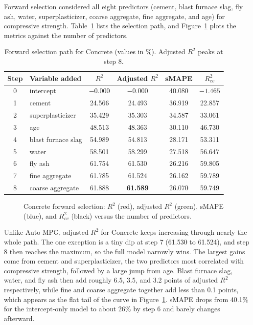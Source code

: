 Forward selection considered all eight predictors (cement, blast furnace slag, fly ash, water, superplasticizer, coarse aggregate, fine aggregate, and age) for compressive strength. Table~\ref{tab:fs-concrete-path} lists the selection path, and Figure~\ref{fig:fs-concrete-path} plots the metrics against the number of predictors.

\begin{table}[H]
    \centering
    \caption{Forward selection path for Concrete (values in \%). Adjusted $R^2$ peaks at step 8.}
    \label{tab:fs-concrete-path}
    \begin{tabular}{clcccc}
        \hline
        Step & Variable added & $R^2$ & Adjusted $R^2$ & sMAPE & $R^2_{cv}$ \\
        \hline
        0 & intercept & $-0.000$ & $-0.000$ & 40.080 & $-1.465$ \\
        1 & cement & 24.566 & 24.493 & 36.919 & 22.857 \\
        2 & superplasticizer & 35.429 & 35.303 & 34.587 & 33.061 \\
        3 & age & 48.513 & 48.363 & 30.110 & 46.730 \\
        4 & blast furnace slag & 54.989 & 54.813 & 28.171 & 53.311 \\
        5 & water & 58.501 & 58.299 & 27.518 & 56.647 \\
        6 & fly ash & 61.754 & 61.530 & 26.216 & 59.805 \\
        7 & fine aggregate & 61.785 & 61.524 & 26.162 & 59.789 \\
        8 & coarse aggregate & 61.888 & \textbf{61.589} & 26.070 & 59.749 \\
        \hline
    \end{tabular}
\end{table}

\begin{figure}[H]
    \centering
    \caption{Concrete forward selection: $R^2$ (red), adjusted $R^2$ (green), sMAPE (blue), and $R^2_{cv}$ (black) versus the number of predictors.}
    \label{fig:fs-concrete-path}
\end{figure}

Unlike Auto MPG, adjusted $R^2$ for Concrete keeps increasing through nearly the whole path. The one exception is a tiny dip at step 7 (61.530 to 61.524), and step 8 then reaches the maximum, so the full model narrowly wins. The largest gains come from cement and superplasticizer, the two predictors most correlated with compressive strength, followed by a large jump from age. Blast furnace slag, water, and fly ash then add roughly 6.5, 3.5, and 3.2 points of adjusted $R^2$ respectively, while fine and coarse aggregate together add less than 0.1 points, which appears as the flat tail of the curve in Figure~\ref{fig:fs-concrete-path}. sMAPE drops from 40.1\% for the intercept-only model to about 26\% by step 6 and barely changes afterward.

